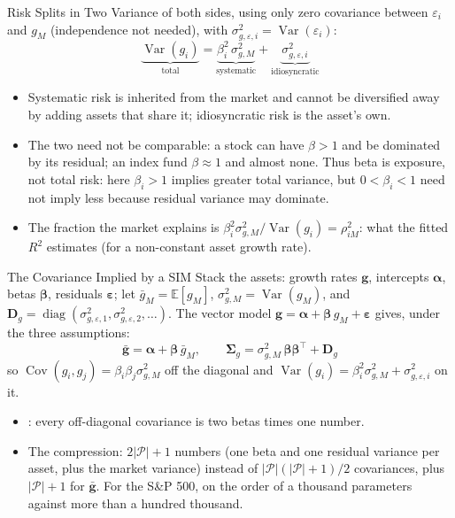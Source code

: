 \documentclass[aspectratio=169,11pt]{beamer}
\newcommand{\E}{\mathbb{E}}
\newcommand{\Var}{\operatorname{Var}}
\newcommand{\Cov}{\operatorname{Cov}}
\newcommand{\bg}{\mathbf{g}}
\newcommand{\bal}{\boldsymbol{\alpha}}
\newcommand{\bbe}{\boldsymbol{\beta}}
\newcommand{\beps}{\boldsymbol{\varepsilon}}
\newcommand{\Dg}{\mathbf{D}_{g}}
\newcommand{\Sig}{\boldsymbol{\Sigma}_{g}}
\newcommand{\np}{|\mathcal P|}
\begin{document}
\begin{frame}{Risk Splits in Two}
  Variance of both sides, using only zero covariance between $\varepsilon_i$ and
  $g_M$ (independence not needed), with $\sigma^2_{g,\varepsilon,i}=\Var(\varepsilon_i)$:
  \[
    \boxed{\underbrace{\Var(g_i)}_{\text{total}}
      =\underbrace{\beta_i^2\,\sigma^2_{g,M}}_{\text{systematic}}
      +\underbrace{\sigma^2_{g,\varepsilon,i}}_{\text{idiosyncratic}}}
  \]

  \vspace{0.2em}
  \begin{itemize}\setlength{\itemsep}{0.45em}
    \item Systematic risk is inherited from the market and cannot be diversified
      away by adding assets that share it; idiosyncratic risk is the asset's own.
    \item The two need not be comparable: a stock can have $\beta>1$ and be
      dominated by its residual; an index fund $\beta\approx1$ and almost none.
      Thus beta is exposure, not total risk: here $\beta_i>1$ implies greater
      total variance, but $0<\beta_i<1$ need not imply less because residual
      variance may dominate.
    \item The fraction the market explains is
      $\beta_i^2\sigma^2_{g,M}/\Var(g_i)=\rho_{iM}^2$: what the fitted $R^2$
      estimates (for a non-constant asset growth rate).
  \end{itemize}
\end{frame}

\begin{frame}{The Covariance Implied by a SIM}
  Stack the assets: growth rates $\bg$, intercepts $\bal$, betas $\bbe$,
  residuals $\beps$; let $\bar g_M=\E[g_M]$, $\sigma^2_{g,M}=\Var(g_M)$, and
  $\Dg=\operatorname{diag}(\sigma^2_{g,\varepsilon,1},\sigma^2_{g,\varepsilon,2},\ldots)$.
  The vector model $\bg=\bal+\bbe\,g_M+\beps$ gives, under the three
  assumptions:
  \[
    \boxed{\bar{\bg}=\bal+\bbe\,\bar g_M,\qquad
      \Sig=\sigma^2_{g,M}\,\bbe\bbe^{\top}+\Dg}
  \]
  so $\Cov(g_i,g_j)=\beta_i\beta_j\sigma^2_{g,M}$ off the diagonal and
  $\Var(g_i)=\beta_i^2\sigma^2_{g,M}+\sigma^2_{g,\varepsilon,i}$ on it.

  \vspace{0.3em}
  \begin{itemize}\setlength{\itemsep}{0.4em}
    \item {}: every off-diagonal covariance
      is two betas times one number.
    \item The compression: $2\np+1$ numbers (one beta and one residual variance
      per asset, plus the market variance) instead of $\np(\np+1)/2$ covariances,
      plus $\np+1$ for $\bar{\bg}$. For the S\&P 500, on the order of a thousand
      parameters against more than a hundred thousand.
  \end{itemize}
\end{frame}
\end{document}
